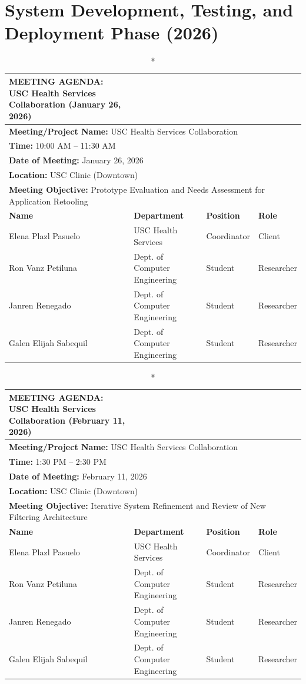 \section{System Development, Testing, and Deployment Phase (2026)}

\begin{longtable}{|p{4cm}|p{4cm}|p{3cm}|p{3cm}|}
\caption*{MEETING AGENDA: USC Health Services Collaboration (January 26, 2026)} \\
\hline
\multicolumn{4}{|l|}{\textbf{Meeting/Project Name:} USC Health Services Collaboration} \\
\multicolumn{4}{|l|}{\textbf{Time:} 10:00 AM – 11:30 AM} \\
\multicolumn{4}{|l|}{\textbf{Date of Meeting:} January 26, 2026} \\
\multicolumn{4}{|l|}{\textbf{Location:} USC Clinic (Downtown)} \\
\multicolumn{4}{|l|}{\textbf{Meeting Objective:} Prototype Evaluation and Needs Assessment for Application Retooling} \\
\hline
\textbf{Name} & \textbf{Department} & \textbf{Position} & \textbf{Role} \\
\hline
Elena Plazl Pasuelo & USC Health Services & Coordinator & Client \\
\hline
Ron Vanz Petiluna & Dept. of Computer Engineering & Student & Researcher \\
\hline
Janren Renegado & Dept. of Computer Engineering & Student & Researcher \\
\hline
Galen Elijah Sabequil & Dept. of Computer Engineering & Student & Researcher \\
\hline
\end{longtable}

\begin{longtable}{|p{4cm}|p{4cm}|p{3cm}|p{3cm}|}
\caption*{MEETING AGENDA: USC Health Services Collaboration (February 11, 2026)} \\
\hline
\multicolumn{4}{|l|}{\textbf{Meeting/Project Name:} USC Health Services Collaboration} \\
\multicolumn{4}{|l|}{\textbf{Time:} 1:30 PM – 2:30 PM} \\
\multicolumn{4}{|l|}{\textbf{Date of Meeting:} February 11, 2026} \\
\multicolumn{4}{|l|}{\textbf{Location:} USC Clinic (Downtown)} \\
\multicolumn{4}{|l|}{\textbf{Meeting Objective:} Iterative System Refinement and Review of New Filtering Architecture} \\
\hline
\textbf{Name} & \textbf{Department} & \textbf{Position} & \textbf{Role} \\
\hline
Elena Plazl Pasuelo & USC Health Services & Coordinator & Client \\
\hline
Ron Vanz Petiluna & Dept. of Computer Engineering & Student & Researcher \\
\hline
Janren Renegado & Dept. of Computer Engineering & Student & Researcher \\
\hline
Galen Elijah Sabequil & Dept. of Computer Engineering & Student & Researcher \\
\hline
\end{longtable}

